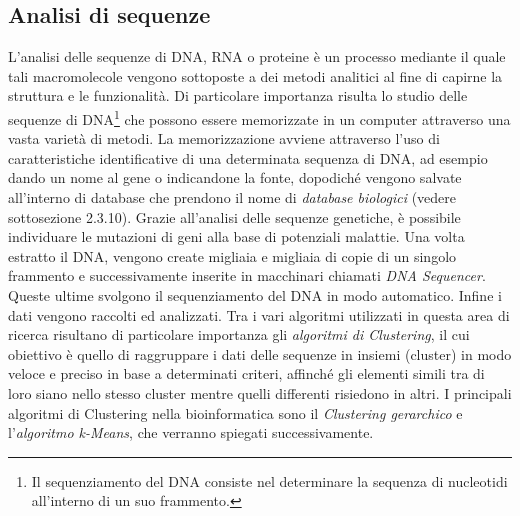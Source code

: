 \subsection{Analisi di sequenze}
L'analisi delle sequenze di DNA, RNA o proteine è un processo mediante il quale tali macromolecole vengono sottoposte a dei metodi analitici al fine di capirne la struttura e le funzionalità.
\newline
Di particolare importanza risulta lo studio delle sequenze di DNA\footnote{Il sequenziamento del DNA consiste nel determinare la sequenza di nucleotidi all'interno di un suo frammento.} che possono essere memorizzate in un computer attraverso una vasta varietà di metodi.
La memorizzazione avviene attraverso l'uso di caratteristiche identificative di una determinata sequenza di DNA, ad esempio dando un nome al gene o indicandone la fonte, dopodiché vengono salvate all'interno di database che prendono il nome di \textit{database biologici} (vedere sottosezione 2.3.10).
\newline
Grazie all'analisi delle sequenze genetiche, è possibile individuare le mutazioni di geni alla base di potenziali malattie.
\newline
Una volta estratto il DNA, vengono create migliaia e migliaia di copie di un singolo frammento e successivamente inserite in macchinari chiamati \textit{DNA Sequencer}. Queste ultime svolgono il sequenziamento del DNA in modo automatico. Infine i dati vengono raccolti ed analizzati.
\newline
Tra i vari algoritmi utilizzati in questa area di ricerca risultano di particolare importanza gli \textit{algoritmi di Clustering}, il cui obiettivo è quello di raggruppare i dati delle sequenze in insiemi (cluster) in modo veloce e preciso in base a determinati criteri, affinché gli elementi simili tra di loro siano nello stesso cluster mentre quelli differenti risiedono in altri. I principali algoritmi di Clustering nella bioinformatica sono il \textit{Clustering gerarchico} e l'\textit{algoritmo k-Means}, che verranno spiegati successivamente.

